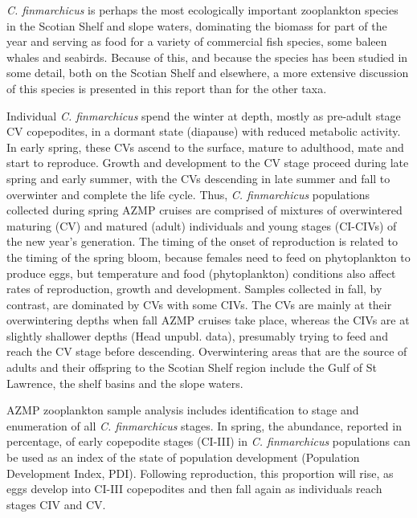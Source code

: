 \documentclass[12pt]{article}\usepackage[]{graphicx}\usepackage[]{color}
\begin{document}
\emph{C. finmarchicus} is perhaps the most ecologically important zooplankton species in the Scotian Shelf and slope waters, dominating the biomass for part of the year and serving as food for a variety of commercial fish species, some baleen whales and seabirds. Because of this, and because the species has been studied in some detail, both on the Scotian Shelf and elsewhere, a more extensive discussion of this species is presented in this report than for the other taxa.

Individual \emph{C. finmarchicus} spend the winter at depth, mostly as pre-adult stage CV copepodites, in a dormant state (diapause) with reduced metabolic activity. In early spring, these CVs ascend to the surface, mature to adulthood, mate and start to reproduce. Growth and development to the CV stage proceed during late spring and early summer, with the CVs descending in late summer and fall to overwinter and complete the life cycle. Thus, \emph{C. finmarchicus} populations collected during spring AZMP cruises are comprised of mixtures of overwintered maturing (CV) and matured (adult) individuals and young stages (CI-CIVs) of the new year's generation. The timing of the onset of reproduction is related to the timing of the spring bloom, because females need to feed on phytoplankton to produce eggs, but temperature and food (phytoplankton) conditions also affect rates of reproduction, growth and development. Samples collected in fall, by contrast, are dominated by CVs with some CIVs. The CVs are mainly at their overwintering depths when fall AZMP cruises take place, whereas the CIVs are at slightly shallower depths (Head unpubl. data), presumably trying to feed and reach the CV stage before descending. Overwintering areas that are the source of adults and their offspring to the Scotian Shelf region include the Gulf of St Lawrence, the shelf basins and the slope waters.

AZMP zooplankton sample analysis includes identification to stage and enumeration of all \emph{C. finmarchicus} stages. In spring, the abundance, reported in percentage, of early copepodite stages (CI-III) in \emph{C. finmarchicus} populations can be used as an index of the state of population development (Population Development Index, PDI). Following reproduction, this proportion will rise, as eggs develop into CI-III copepodites and then fall again as individuals reach stages CIV and CV.
\end{document}
